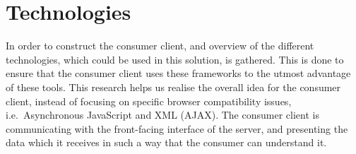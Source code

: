 \section{Technologies} \label{sec:technologies}
In order to construct the consumer client, and overview of the different technologies, which could be used in this solution, is gathered.
This is done to ensure that the consumer client uses these frameworks to the utmost advantage of these tools.
This research helps us realise the overall idea for the consumer client, instead of focusing on specific browser compatibility issues, i.e.~Asynchronous JavaScript and XML (AJAX).
The consumer client is communicating with the front-facing interface of the server, and presenting the data which it receives in such a way that the consumer can understand it.
